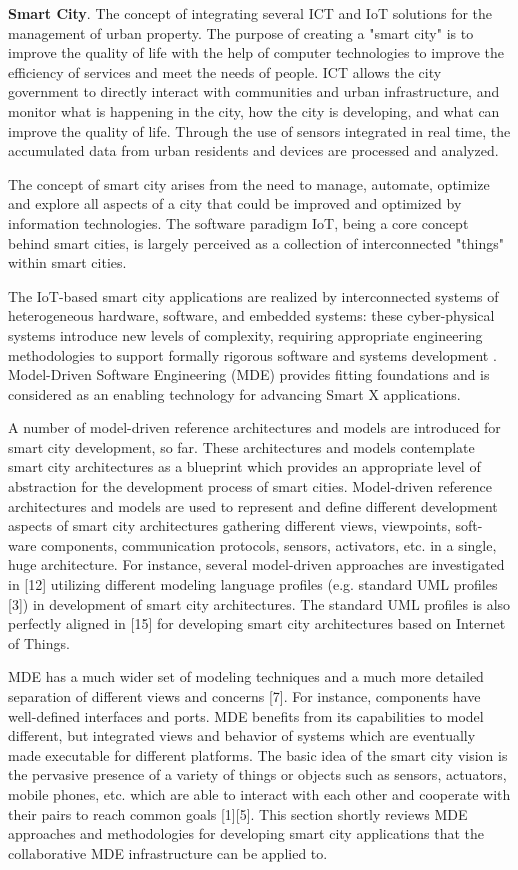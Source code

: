 \textbf{Smart City}. The concept of integrating several ICT and IoT solutions for the management of urban property. The purpose of creating a "smart city" is to improve the quality of life with the help of computer technologies to improve the efficiency of services and meet the needs of people. ICT allows the city government to directly interact with communities and urban infrastructure, and monitor what is happening in the city, how the city is developing, and what can improve the quality of life. Through the use of sensors integrated in real time, the accumulated data from urban residents and devices are processed and analyzed. 

The concept of smart city arises from the need to manage, automate, optimize and explore all aspects of a city that could be improved and optimized by information technologies. The software paradigm IoT, being a core concept behind smart cities, is largely perceived as a collection of interconnected "things" within smart cities.

The IoT-based smart city applications are realized by interconnected systems of heterogeneous hardware, software, and embedded systems: these cyber-physical systems introduce new levels of complexity, requiring appropriate engineering methodologies to support formally rigorous software and systems development \cite{Kuryazov+2018}. Model-Driven Software Engineering (MDE) provides fitting foundations and is considered as an enabling technology for advancing Smart X applications.

A number of model-driven reference architectures \cite{KateuleWinter2018} and models \cite{Yin+2015} are introduced for smart city development, so far. These architectures and models contemplate smart city architectures as a blueprint which provides an appropriate level of abstraction for the development process of smart cities. Model-driven reference architectures and models are used to represent and define different development aspects of smart city architectures gathering different views, viewpoints, soft- ware components, communication protocols, sensors, activators, etc. in a single, huge architecture. For instance, several model-driven approaches are investigated in [12] utilizing different modeling language profiles (e.g. standard UML profiles [3]) in development of smart city architectures. The standard UML profiles is also perfectly aligned in [15] for developing smart city architectures based on Internet of Things.

MDE has a much wider set of modeling techniques and a much more detailed separation of different views and concerns [7]. For instance, components have well-defined interfaces and ports. MDE benefits from its capabilities to model different, but integrated views and behavior of systems which are eventually made executable for different platforms. The basic idea of the smart city vision is the pervasive presence of a variety of things or objects such as sensors, actuators, mobile phones, etc. which are able to interact with each other and cooperate with their pairs to reach common goals [1][5]. This section shortly reviews MDE approaches and methodologies for developing smart city applications that the collaborative MDE infrastructure can be applied to.

